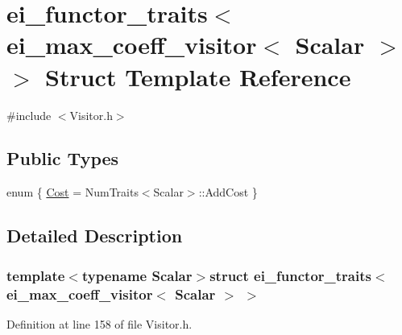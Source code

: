 \hypertarget{structei__functor__traits_3_01ei__max__coeff__visitor_3_01_scalar_01_4_01_4}{\section{ei\-\_\-functor\-\_\-traits$<$ ei\-\_\-max\-\_\-coeff\-\_\-visitor$<$ Scalar $>$ $>$ Struct Template Reference}
\label{structei__functor__traits_3_01ei__max__coeff__visitor_3_01_scalar_01_4_01_4}
}


{\ttfamily \#include $<$Visitor.\-h$>$}

\subsection*{Public Types}
\begin{DoxyCompactItemize}
\item 
enum \{ \hyperlink{structei__functor__traits_3_01ei__max__coeff__visitor_3_01_scalar_01_4_01_4_a6746fcf8051282fc6603ee987a7c6738af9888423f3f3d25c2adcebae23654c68}{Cost} = Num\-Traits$<$Scalar$>$\-:\-:Add\-Cost
 \}
\end{DoxyCompactItemize}


\subsection{Detailed Description}
\subsubsection*{template$<$typename Scalar$>$struct ei\-\_\-functor\-\_\-traits$<$ ei\-\_\-max\-\_\-coeff\-\_\-visitor$<$ Scalar $>$ $>$}



Definition at line 158 of file Visitor.\-h.



